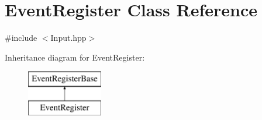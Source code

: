 \hypertarget{class_event_register}{\section{Event\-Register Class Reference}
\label{class_event_register}
}


{\ttfamily \#include $<$Input.\-hpp$>$}

Inheritance diagram for Event\-Register\-:\begin{figure}[H]
\begin{center}
\leavevmode
\includegraphics[height=2.000000cm]{class_event_register}
\end{center}
\end{figure}
